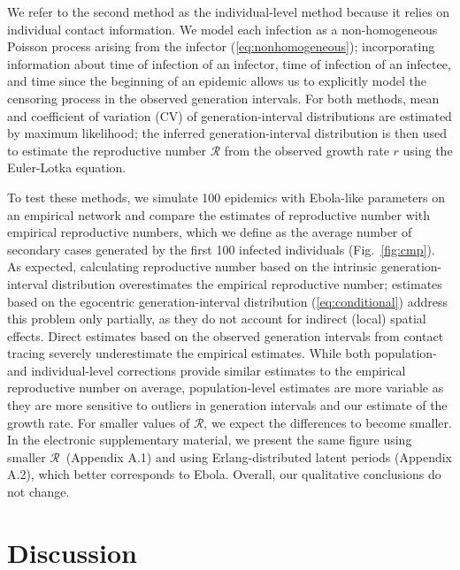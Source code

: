 \documentclass[12pt]{article}
\newcommand{\eref}[1]{(\ref{eq:#1})}
\newcommand{\fref}[1]{Fig.~\ref{fig:#1}}
\newcommand{\RR}{\ensuremath{{\mathcal R}}}
\begin{document}
We refer to the second method as the individual-level method because it relies on individual contact information.
We model each infection as a non-homogeneous Poisson process arising from the infector \eref{nonhomogeneous}; 
incorporating information about time of infection of an infector, time of infection of an infectee, and time since the beginning of an epidemic allows us to explicitly model the censoring process in the observed generation intervals.
For both methods, mean and coefficient of variation (CV) of generation-interval distributions are estimated by maximum likelihood; the inferred generation-interval distribution is then used to estimate the reproductive number $\RR$ from the observed growth rate $r$ using the Euler-Lotka equation.

To test these methods, we simulate 100 epidemics with Ebola-like parameters on an empirical network \citep{leskovec2016snap}
and compare the estimates of reproductive number with empirical reproductive numbers, which we define as the average number of secondary cases generated by the first 100 infected individuals (\fref{cmp}).
As expected, calculating reproductive number based on the intrinsic generation-interval distribution overestimates the empirical reproductive number;
estimates based on the egocentric generation-interval distribution \eref{conditional} address this problem only partially, as they do not account for indirect (local) spatial effects. 
Direct estimates based on the observed generation intervals from contact tracing severely underestimate the empirical estimates.
While both population- and individual-level corrections provide similar estimates to the empirical reproductive number on average,
population-level estimates are more variable as they are more sensitive to outliers in generation intervals and our estimate of the growth rate.
For smaller values of \RR, we expect the differences to become smaller.
In the electronic supplementary material, we present the same figure using smaller \RR\ (Appendix A.1) and using Erlang-distributed latent periods (Appendix A.2), which better corresponds to Ebola.
Overall, our qualitative conclusions do not change.

\section{Discussion}
\end{document}
